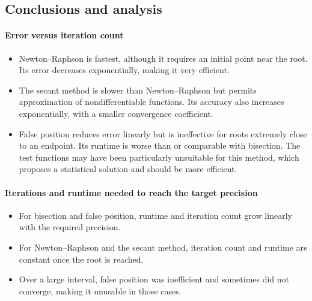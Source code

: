 \subsection{Conclusions and analysis}
\paragraph{Error versus iteration count}
\begin{itemize}
\item Newton--Raphson is fastest, although it requires an initial point near the root. Its error decreases exponentially, making it very efficient.
\item The secant method is slower than Newton--Raphson but permits approximation of nondifferentiable functions. Its accuracy also increases exponentially, with a smaller convergence coefficient.
\item False position reduces error linearly but is ineffective for roots extremely close to an endpoint. Its runtime is worse than or comparable with bisection. The test functions may have been particularly unsuitable for this method, which proposes a statistical solution and should be more efficient.
\end{itemize}

\paragraph{Iterations and runtime needed to reach the target precision}
\begin{itemize}
\item For bisection and false position, runtime and iteration count grow linearly with the required precision.
\item For Newton--Raphson and the secant method, iteration count and runtime are constant once the root is reached.
\item Over a large interval, false position was inefficient and sometimes did not converge, making it unusable in those cases.
\end{itemize}

